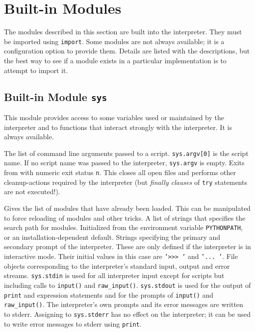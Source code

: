 \section{Built-in Modules}

The modules described in this section are built into the interpreter.
They must be imported using
{\tt import}.
Some modules are not always available; it is a configuration option to
provide them.
Details are listed with the descriptions, but the best way to see if
a module exists in a particular implementation is to attempt to import
it.

\subsection{Built-in Module {\tt sys}}

This module provides access to some variables used or maintained by the
interpreter and to functions that interact strongly with the interpreter.
It is always available.
\begin{description}

The list of command line arguments passed to a {\Python} script.
{\tt sys.argv[0]}
is the script name.
If no script name was passed to the {\Python} interpreter,
{\tt sys.argv}
is empty.
Exits from {\Python} with numeric exit status
{\tt n}.
This closes all open files and performs other cleanup-actions required by
the interpreter (but
{\em finally clauses}
of
{\tt try}
statements are not executed!).

Gives the list of modules that have already been loaded.
This can be manipulated to force reloading of modules and other tricks.
A list of strings that specifies the search path for modules.
Initialized from the environment variable {\tt PYTHONPATH}, or an
installation-dependent default.
Strings specifying the primary and secondary prompt of the interpreter.
These are only defined if the interpreter is in interactive mode.
Their initial values in this case are
{\tt '>>> '}
and
{\tt '... '}.
File objects corresponding to the interpreter's standard input, output
and error streams.
{\tt sys.stdin}
is used for all interpreter input except for scripts but including calls
to
{\tt input()}
and
{\tt raw\_input()}.
{\tt sys.stdout}
is used for the output of
{\tt print} and expression statements
and for the prompts of
{\tt input()}
and
{\tt raw\_input()}.
The interpreter's own prompts and its error messages are written to
stderr.
Assigning to
{\tt sys.stderr}
has no effect on the interpreter; it can be used to write error messages
to stderr using
{\tt print}.
\end{description}

